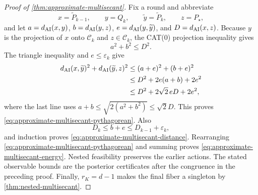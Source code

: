 \begin{proof}[Proof of \cref{thm:approximate-multisecant}]
Fix a round and abbreviate
\[
  x=\widetilde P_{k-1},\qquad y=Q_k,\qquad
  \widetilde y=\widetilde P_k,\qquad z=P_\star,
\]
and let \(a=d_{\mathrm{AI}}(x,y)\), \(b=d_{\mathrm{AI}}(y,z)\),
\(e=d_{\mathrm{AI}}(y,\widetilde y)\), and \(D=d_{\mathrm{AI}}(x,z)\).
Because \(y\) is the projection of \(x\) onto \(\mathscr C_k\) and
\(z\in\mathscr C_k\), the CAT(0) projection inequality gives
\[
  a^2+b^2\le D^2.
\]
The triangle inequality and \(e\le\varepsilon_k\) give
\[
\begin{aligned}
  d_{\mathrm{AI}}(x,\widetilde y)^2+d_{\mathrm{AI}}(\widetilde y,z)^2
  &\le(a+e)^2+(b+e)^2\\
  &\le D^2+2e(a+b)+2e^2\\
  &\le D^2+2\sqrt2\,eD+2e^2,
\end{aligned}
\]
where the last line uses
\(a+b\le\sqrt{2(a^2+b^2)}\le\sqrt2D\).  This proves
\cref{eq:approximate-multisecant-pythagorean}.  Also
\[
  D_k\le b+e\le D_{k-1}+\varepsilon_k,
\]
and induction proves \cref{eq:approximate-multisecant-distance}.  Rearranging
\cref{eq:approximate-multisecant-pythagorean} and summing proves
\cref{eq:approximate-multisecant-energy}.  Nested feasibility preserves the
earlier actions.  The stated observable bounds are the posterior certificates
after the congruence in the preceding proof.  Finally, \(r_K=d-1\) makes the
final fiber a singleton by \cref{thm:nested-multisecant}.
\end{proof}
